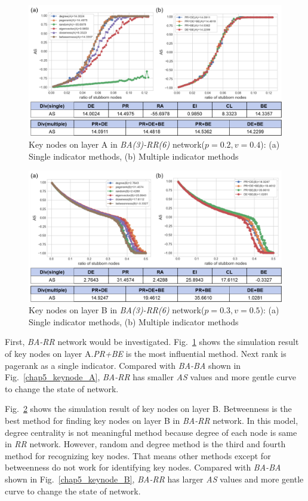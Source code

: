 \begin{figure}[!htb]
	\centering
	\includegraphics[width=\hsize]{figure/chap5_keynode_BA_RR_A.png}
	\caption{Key nodes on layer A in \textit{BA(3)-RR(6)} network($p=0.2, v=0.4$):
		(a) Single indicator methods, (b) Multiple indicator methods}
	\label{chap5_keynode_BA_RR_A}
\end{figure}
\begin{figure}[!htb]
	\centering
	\includegraphics[width=\hsize]{figure/chap5_keynode_BA_RR_B.png}
	\caption{Key nodes on layer B in \textit{BA(3)-RR(6)} network($p=0.3, v=0.5$):
		(a) Single indicator methods, (b) Multiple indicator methods}
	\label{chap5_keynode_BA_RR_B}
\end{figure}

First, \textit{BA-RR} network would be investigated. Fig.~\ref{chap5_keynode_BA_RR_A} shows the simulation result of key nodes on layer A.\textit{PR+BE} is the most influential method. Next rank is pagerank as a single indicator. Compared with \textit{BA-BA} shown in Fig.~\ref{chap5_keynode_A}, \textit{BA-RR} has smaller \textit{AS} values and more gentle curve to change the state of network. 

Fig.~\ref{chap5_keynode_BA_RR_B} shows the simulation result of key nodes on layer B. Betweenness is the best method for finding key nodes on layer B in \textit{BA-RR} network. In this model, degree centrality is not meaningful method because degree of each node is same in \textit{RR} network. However, random and degree method is the third and fourth method for recognizing key nodes. That means other methods except for betweenness do not work for identifying key nodes. Compared with \textit{BA-BA} shown in Fig.~\ref{chap5_keynode_B}, \textit{BA-RR} has larger \textit{AS} values and more gentle curve to change the state of network. 


